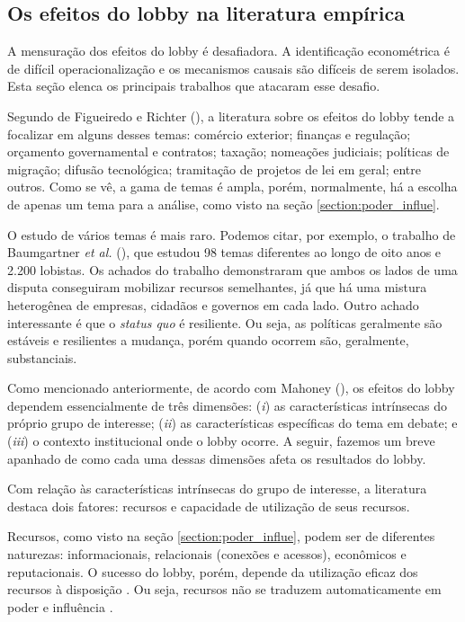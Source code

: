 \subsection{Os efeitos do lobby na literatura empírica}
\label{section:effects}
A mensuração dos efeitos do lobby é desafiadora. A identificação econométrica é de difícil operacionalização e os mecanismos causais são difíceis de serem isolados. Esta seção elenca os principais trabalhos que atacaram esse desafio.

Segundo de Figueiredo e Richter (\citeyear{de_figueiredo_advancing_2014}), a literatura sobre os efeitos do lobby tende a focalizar em alguns desses temas: comércio exterior; finanças e regulação; orçamento governamental e contratos; taxação; nomeações judiciais; políticas de migração; difusão tecnológica; tramitação de projetos de lei em geral; entre outros. Como se vê, a gama de temas é ampla, porém, normalmente, há a escolha de apenas um tema para a análise, como visto na seção \ref{section:poder_influe}. 

O estudo de vários temas é mais raro. Podemos citar, por exemplo, o trabalho de Baumgartner \textit{et al.} (\citeyear{baumgartner2009lobbying}), que estudou 98 temas diferentes ao longo de oito anos e 2.200 lobistas. Os achados do trabalho demonstraram que ambos os lados de uma disputa conseguiram mobilizar recursos semelhantes, já que há uma mistura heterogênea de empresas, cidadãos e governos em cada lado. Outro achado interessante é que o \textit{status quo} é resiliente. Ou seja, as políticas geralmente são estáveis e resilientes a mudança, porém quando ocorrem são, geralmente, substanciais.

Como mencionado anteriormente, de acordo com Mahoney (\citeyear{mahoney_lobbying_2007}), os efeitos do lobby dependem essencialmente de três dimensões: (\textit{i}) as características intrínsecas do próprio grupo de interesse; (\textit{ii}) as características específicas do tema em debate; e (\textit{iii}) o contexto institucional onde o lobby ocorre. A seguir, fazemos um breve apanhado de como cada uma dessas dimensões afeta os resultados do lobby.

Com relação às características intrínsecas do grupo de interesse, a literatura destaca dois fatores: recursos e capacidade de utilização de seus recursos.

    Recursos, como visto na seção \ref{section:poder_influe}, podem ser de diferentes naturezas: informacionais, relacionais (conexões e acessos), econômicos e reputacionais. O sucesso do lobby, porém, depende da utilização eficaz dos recursos à disposição \cite{Pop2013Lobbying}. Ou seja, recursos não se traduzem automaticamente em poder e influência \cite{simon_notes_1953}.

